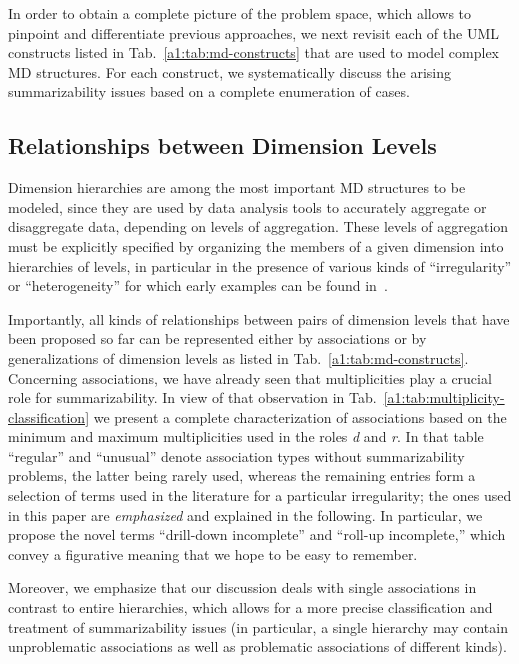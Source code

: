 In order to obtain a complete picture of the problem space, which
allows to pinpoint and differentiate previous approaches, we next
revisit each of the UML constructs listed in
Tab.~\ref{a1:tab:md-constructs} that are used to model complex MD
structures.  For each construct, we systematically discuss the
arising summarizability issues based on a complete enumeration of
cases.

\subsection{Relationships between Dimension Levels}
Dimension hierarchies are among the most important MD structures to
be modeled, since they are used by data analysis tools to accurately
aggregate or disaggregate data, depending on levels of aggregation.
These levels of aggregation must be explicitly specified by
organizing the members of a given dimension into hierarchies of
levels, in particular in the presence of various kinds of
``irregularity'' or ``heterogeneity'' for which early examples can
be found in~\cite{DBLP:conf/ssdbm/LehnerAW98}.

Importantly, all kinds of relationships between pairs of dimension
levels that have been proposed so far can be represented either by
associations or by generalizations of dimension levels as listed in
Tab.~\ref{a1:tab:md-constructs}. Concerning associations, we have
already seen that multiplicities play a crucial role for
summarizability.  In view of that observation in
Tab.~\ref{a1:tab:multiplicity-classification} we present a complete
characterization of associations based on the minimum and maximum
multiplicities used in the roles \emph{d} and \emph{r}.  In that
table ``regular'' and ``unusual'' denote association types without
summarizability problems, the latter being rarely used, whereas the
remaining entries form a selection of terms used in the literature
for a particular irregularity; the ones used in this paper are
\emph{emphasized} and explained in the following.  In particular, we
propose the novel terms ``drill-down incomplete'' and ``roll-up
incomplete,'' which convey a figurative meaning that we hope to be
easy to remember.

Moreover, we emphasize that our discussion deals with single
associations in contrast to entire hierarchies, which allows for a
more precise classification and treatment of summarizability issues
(in particular, a single hierarchy may contain unproblematic
associations as well as problematic associations of different
kinds).

